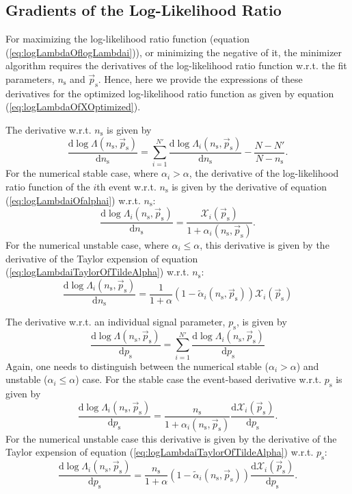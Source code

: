 \documentclass{article}
\newcommand{\ns}{n_{\mathrm{s}}}
\newcommand{\ps}{\vec{p}_{\mathrm{s}}}
\begin{document}
\subsection{Gradients of the Log-Likelihood Ratio}

For maximizing the log-likelihood ratio function (equation (\ref{eq:logLambdaOflogLambdai})),
or minimizing the negative of it, the minimizer algorithm requires the
derivatives of the log-likelihood ratio function w.r.t. the fit parameters,
$\ns$ and $\ps$.
Hence, here we provide the expressions of these derivatives
for the optimized log-likelihood ratio function as given by equation
(\ref{eq:logLambdaOfXOptimized}).

The derivative w.r.t. $\ns$ is given by
\begin{equation}
\frac{\mathrm{d} \log \Lambda(\ns,\ps)}{\mathrm{d} \ns} = \sum_{i=1}^{N'} \frac{\mathrm{d} \log \Lambda_i(\ns,\ps)}{\mathrm{d} \ns} - \frac{N - N'}{N - \ns}.
\end{equation}
For the numerical stable case, where $\alpha_i > \alpha$, the derivative of the
log-likelihood ratio function of the $i$th event w.r.t. $\ns$ is given by the
derivative of equation (\ref{eq:logLambdaiOfalphai}) w.r.t. $\ns$:
\begin{equation}
 \frac{\mathrm{d} \log \Lambda_i(\ns,\ps)}{\mathrm{d} \ns} = \frac{\mathcal{X}_i(\ps)}{1+\alpha_i(\ns,\ps)}.
\end{equation}
For the numerical unstable case, where $\alpha_i \leq \alpha$, this derivative is
given by the derivative of the Taylor expension of equation (\ref{eq:logLambdaiTaylorOfTildeAlpha})
w.r.t. $\ns$:
\begin{equation}
 \frac{\mathrm{d} \log \Lambda_i(\ns,\ps)}{\mathrm{d} \ns} = \frac{1}{1+\alpha}\left(1 - \tilde{\alpha}_i(\ns,\ps)\right) \mathcal{X}_i(\ps)
\end{equation}

The derivative w.r.t. an individual signal parameter, $p_{\mathrm{s}}$, is given by
\begin{equation}
 \frac{\mathrm{d} \log \Lambda(\ns,\ps)}{\mathrm{d} p_{\mathrm{s}}} = \sum_{i=1}^{N'} \frac{\mathrm{d}\log\Lambda_i(\ns,\ps)}{\mathrm{d}p_{\mathrm{s}}}
\end{equation}
Again, one needs to distinguish between the numerical stable ($\alpha_i > \alpha$)
and unstable ($\alpha_i \leq \alpha$) case.
For the stable case the event-based derivative w.r.t. $p_{\mathrm{s}}$ is given by
\begin{equation}
 \frac{\mathrm{d}\log\Lambda_i(\ns,\ps)}{\mathrm{d}p_{\mathrm{s}}} = \frac{\ns}{1+\alpha_i(\ns,\ps)} \frac{\mathrm{d}\mathcal{X}_i(\ps)}{\mathrm{d}p_{\mathrm{s}}}.
\end{equation}
For the numerical unstable case this derivative is
given by the derivative of the Taylor expension of equation (\ref{eq:logLambdaiTaylorOfTildeAlpha})
w.r.t. $p_{\mathrm{s}}$:
\begin{equation}
 \frac{\mathrm{d}\log\Lambda_i(\ns,\ps)}{\mathrm{d}p_{\mathrm{s}}} = \frac{\ns}{1+\alpha}\left(1 - \tilde{\alpha}_i(\ns,\ps)\right) \frac{\mathrm{d}\mathcal{X}_i(\ps)}{\mathrm{d}p_{\mathrm{s}}}.
\end{equation}
\end{document}
